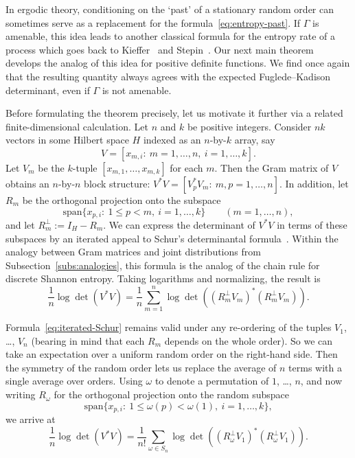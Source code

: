 \documentclass[12pt,a4paper]{article}
\numberwithin{equation}{section}
\theoremstyle{remark}
\renewcommand{\rm}[1]{\mathrm{#1}}
\newcommand{\G}{\Gamma}
\begin{document}
In ergodic theory, conditioning on the `past' of a stationary random order can sometimes serve as a replacement for the formula~\eqref{eq:entropy-past}.  If $\G$ is amenable, this idea leads to another classical formula for the entropy rate of a process which goes back to Kieffer~\cite{Kie75} and Stepin~\cite{Stepin78}.  Our next main theorem develops the analog of this idea for positive definite functions.  We find once again that the resulting quantity always agrees with the expected Fuglede--Kadison determinant, even if $\G$ is not amenable.

Before formulating the theorem precisely, let us motivate it further via a related finite-dimensional calculation.  Let $n$ and $k$ be positive integers.  Consider $nk$ vectors in some Hilbert space $H$ indexed as an $n$-by-$k$ array, say
\[V = [x_{m,i}:\ m=1,\dots,n,\ i=1,\dots,k].\]
Let $V_m$ be the $k$-tuple $[x_{m,1},\dots,x_{m,k}]$ for each $m$.  Then the Gram matrix of $V$ obtains an $n$-by-$n$ block structure: $V^\ast V = [V_p^\ast V_m:\ m,p= 1,\dots,n]$.  In addition, let $R_m$ be the orthogonal projection onto the subspace
\[\rm{span}\{x_{p,i}:\ 1 \le p < m,\ i=1,\dots,k\} \qquad (m=1,\dots,n),\]
and let $R_m^\perp := I_H - R_m$.  We can express the determinant of $V^\ast V$ in terms of these subspaces by an iterated appeal to Schur's determinantal formula~\cite[Subsec. 0.8.5]{HorJohMA}.  Within the analogy between Gram matrices and joint distributions from Subsection~\ref{subs:analogies}, this formula is the analog of the chain rule for discrete Shannon entropy.  Taking logarithms and normalizing, the result is
\begin{equation}\label{eq:iterated-Schur}
\frac{1}{n}\log \det(V^\ast V) =\frac{1}{n}\sum_{m=1}^n \log \det ((R_m^\perp V_m)^\ast (R_m^\perp V_m)).
\end{equation}

Formula~\eqref{eq:iterated-Schur} remains valid under any re-ordering of the tuples $V_1$, \dots, $V_n$ (bearing in mind that each $R_m$ depends on the whole order).  So we can take an expectation over a uniform random order on the right-hand side.  Then the symmetry of the random order lets us replace the average of $n$ terms with a single average over orders.  Using $\omega$ to denote a permutation of $1$, \dots, $n$, and now writing $R_\omega$ for the orthogonal projection onto the random subspace
\[\rm{span}\{x_{p,i}:\ 1\le \omega(p) < \omega(1),\ i=1,\dots,k\},\]
we arrive at
\begin{equation}\label{eq:iterated-Schur-2}
\frac{1}{n}\log \det(V^\ast V) = \frac{1}{n!}\sum_{\omega \in S_n} \log \det ((R_\omega^\perp V_1)^\ast (R_\omega^\perp V_1)).
\end{equation}
\end{document}
